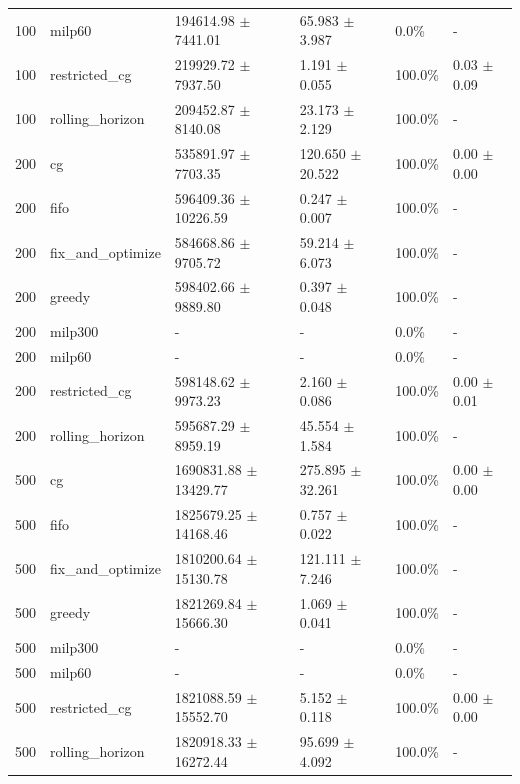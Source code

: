 \begin{tabular}{rlllll}
100 & milp60 & 194614.98 $\pm$ 7441.01 & 65.983 $\pm$ 3.987 & 0.0\% & - \\
100 & restricted_cg & 219929.72 $\pm$ 7937.50 & 1.191 $\pm$ 0.055 & 100.0\% & 0.03 $\pm$ 0.09 \\
100 & rolling_horizon & 209452.87 $\pm$ 8140.08 & 23.173 $\pm$ 2.129 & 100.0\% & - \\
200 & cg & 535891.97 $\pm$ 7703.35 & 120.650 $\pm$ 20.522 & 100.0\% & 0.00 $\pm$ 0.00 \\
200 & fifo & 596409.36 $\pm$ 10226.59 & 0.247 $\pm$ 0.007 & 100.0\% & - \\
200 & fix_and_optimize & 584668.86 $\pm$ 9705.72 & 59.214 $\pm$ 6.073 & 100.0\% & - \\
200 & greedy & 598402.66 $\pm$ 9889.80 & 0.397 $\pm$ 0.048 & 100.0\% & - \\
200 & milp300 & - & - & 0.0\% & - \\
200 & milp60 & - & - & 0.0\% & - \\
200 & restricted_cg & 598148.62 $\pm$ 9973.23 & 2.160 $\pm$ 0.086 & 100.0\% & 0.00 $\pm$ 0.01 \\
200 & rolling_horizon & 595687.29 $\pm$ 8959.19 & 45.554 $\pm$ 1.584 & 100.0\% & - \\
500 & cg & 1690831.88 $\pm$ 13429.77 & 275.895 $\pm$ 32.261 & 100.0\% & 0.00 $\pm$ 0.00 \\
500 & fifo & 1825679.25 $\pm$ 14168.46 & 0.757 $\pm$ 0.022 & 100.0\% & - \\
500 & fix_and_optimize & 1810200.64 $\pm$ 15130.78 & 121.111 $\pm$ 7.246 & 100.0\% & - \\
500 & greedy & 1821269.84 $\pm$ 15666.30 & 1.069 $\pm$ 0.041 & 100.0\% & - \\
500 & milp300 & - & - & 0.0\% & - \\
500 & milp60 & - & - & 0.0\% & - \\
500 & restricted_cg & 1821088.59 $\pm$ 15552.70 & 5.152 $\pm$ 0.118 & 100.0\% & 0.00 $\pm$ 0.00 \\
500 & rolling_horizon & 1820918.33 $\pm$ 16272.44 & 95.699 $\pm$ 4.092 & 100.0\% & - \\
\bottomrule
\end{tabular}
